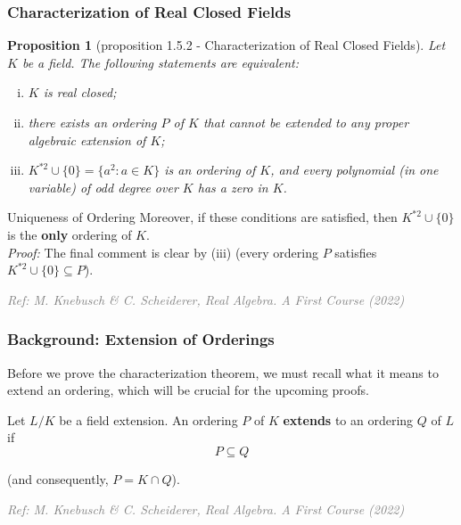 \documentclass[11pt]{beamer}
\newtheorem{proposition}{Proposition}
\begin{document}
\begin{frame}
    \frametitle{Characterization of Real Closed Fields}

    \begin{proposition}[proposition 1.5.2 - Characterization of Real Closed Fields]
        Let $K$ be a field. The following statements are equivalent:
        \begin{enumerate}[(i)]
            \setlength{\itemsep}{0.5em}
            \item $K$ is real closed;
            \item there exists an ordering $P$ of $K$ that cannot be extended to any proper algebraic extension of $K$;
            \item $K^{*2} \cup \{0\} = \{a^2 : a \in K\}$ is an ordering of $K$, and every polynomial (in one variable) of odd degree over $K$ has a zero in $K$.
        \end{enumerate}
    \end{proposition}
    
    \vspace{0.4em}
    
    \begin{alertblock}{Uniqueness of Ordering}
        Moreover, if these conditions are satisfied, then $K^{*2} \cup \{0\}$ is the \textbf{only} ordering of $K$.
        \\ \vspace{0.2em}
        \footnotesize{\textit{Proof:} The final comment is clear by (iii) (every ordering $P$ satisfies $K^{*2} \cup \{0\} \subseteq P$).}
    \end{alertblock}
    \vspace*{\fill}
    \hfill \textcolor{gray}{\tiny \textit{Ref: M. Knebusch \& C. Scheiderer, Real Algebra. A First Course (2022)}}
\end{frame}

\begin{frame}
    \frametitle{Background: Extension of Orderings}
    
    Before we prove the characterization theorem, we must recall what it means to extend an ordering, which will be crucial for the upcoming proofs.

    \vspace{0.6em}

    \begin{definition}[Definition 1.3.1]
        Let $L/K$ be a field extension. An ordering $P$ of $K$ \textbf{extends} to an ordering $Q$ of $L$ if 
        \[ P \subseteq Q \]
        \vspace{-1em}
        \begin{center}
            \footnotesize{(and consequently, $P = K \cap Q$).}
        \end{center}
    \end{definition}

    \vspace{0.4em}

    


    \vspace*{\fill}
    \hfill \textcolor{gray}{\tiny \textit{Ref: M. Knebusch \& C. Scheiderer, Real Algebra. A First Course (2022)}}
\end{frame}
\end{document}
